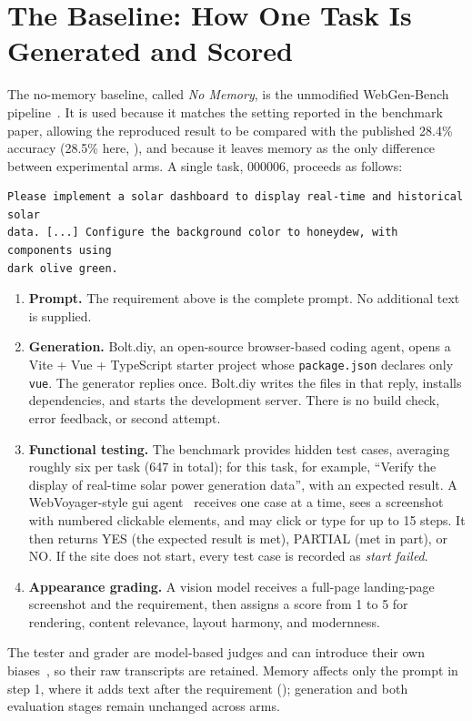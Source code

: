 \section{The Baseline: How One Task Is Generated and Scored}
\label{sec:walkthrough}
The no-memory baseline, called \emph{No Memory}, is the unmodified WebGen-Bench pipeline~\cite{lu2025webgenbench}. It is used because it matches the setting reported in the benchmark paper, allowing the reproduced result to be compared with the published 28.4\% accuracy (28.5\% here, ), and because it leaves memory as the only difference between experimental arms. A single task, 000006, proceeds as follows:

\medskip\noindent\begin{minipage}{\linewidth}
\vspace{0.5\baselineskip}
\begin{lstlisting}
Please implement a solar dashboard to display real-time and historical solar
data. [...] Configure the background color to honeydew, with components using
dark olive green.
\end{lstlisting}
\end{minipage}

\begin{enumerate}
  \item \textbf{Prompt.} The requirement above is the complete prompt. No additional text is supplied.
  \item \textbf{Generation.} Bolt.diy, an open-source browser-based coding agent, opens a Vite + Vue + TypeScript starter project whose \texttt{package.json} declares only \texttt{vue}. The generator replies once. Bolt.diy writes the files in that reply, installs dependencies, and starts the development server. There is no build check, error feedback, or second attempt.
  \item \textbf{Functional testing.} The benchmark provides hidden test cases, averaging roughly six per task (647 in total); for this task, for example, ``Verify the display of real-time solar power generation data'', with an expected result. A WebVoyager-style \gls{gui} agent~\cite{he2024webvoyager} receives one case at a time, sees a screenshot with numbered clickable elements, and may click or type for up to 15 steps. It then returns YES (the expected result is met), PARTIAL (met in part), or NO. If the site does not start, every test case is recorded as \emph{start failed}.
  \item \textbf{Appearance grading.} A vision model receives a full-page landing-page screenshot and the requirement, then assigns a score from 1 to 5 for rendering, content relevance, layout harmony, and modernness.
\end{enumerate}
The tester and grader are model-based judges and can introduce their own biases~\cite{zheng2023judge}, so their raw transcripts are retained. Memory affects only the prompt in step 1, where it adds text after the requirement (); generation and both evaluation stages remain unchanged across arms.

